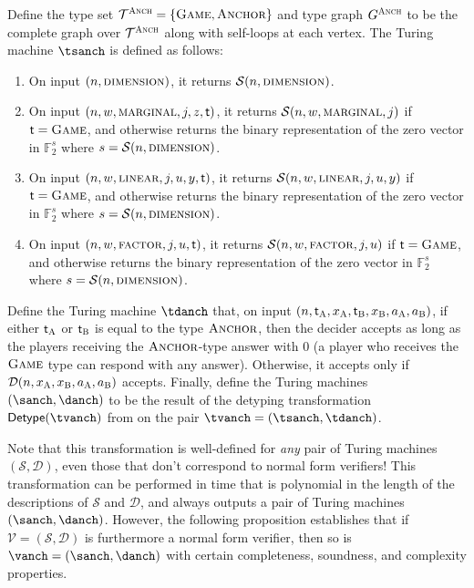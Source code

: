 \documentclass[11pt]{article}
\theoremstyle{definition}
\newcommand{\F}{\ensuremath{\mathbb{F}}}
\newcommand{\sampler}{\mathcal{S}}
\newcommand{\decider}{\mathcal{D}}
\newcommand{\verifier}{\mathcal{V}}
\newcommand{\type}{\mathcal{T}}
\newcommand{\gamestyle}[1]{\ensuremath{\textsc{#1}}\xspace}
\newcommand{\labelstyle}[1]{\ensuremath{\textsc{#1}}\xspace}
\newcommand{\tvarstyle}[1]{\mathsf{#1}}
\newcommand{\tvar}{\ensuremath{\tvarstyle{t}}}
\newcommand{\alice}{\labelstyle{A}}
\newcommand{\bob}{\labelstyle{B}}
\newcommand{\typestyle}[1]{\ensuremath{\textsc{#1}}\xspace}
\newcommand{\Anchor}{\typestyle{Anchor}}
\renewcommand{\Game}{\typestyle{Game}}
\newcommand{\anch}{\gamestyle{Anch}}
\newcommand{\tmstyle}[1]{\ensuremath{\mathsf{#1}}}
\newcommand{\detype}{\tmstyle{Detype}}
\begin{document}
Define the type set $\type^\anch = \{\Game, \Anchor\}$ and type graph
$G^\anch$ to be the complete graph over $\type^\anch$ along with self-loops at
each vertex. The Turing machine $\tsanch$ is defined as follows:
\begin{enumerate}
	\item On input $(n,\gamestyle{dimension})$, it returns $\sampler(n,\gamestyle{dimension})$.
	\item On input $(n,w,\gamestyle{marginal},j,z,\tvar)$, it returns $\sampler(n,w,\gamestyle{marginal},j)$ if $\tvar = \Game$, and otherwise returns the binary representation of the zero vector in $\F_2^s$ where $s = \sampler(n,\gamestyle{dimension})$.
	\item On input $(n,w,\gamestyle{linear},j,u,y,\tvar)$, it returns $\sampler(n,w,\gamestyle{linear},j,u,y)$ if $\tvar = \Game$, and otherwise returns the binary representation of the zero vector in $\F_2^s$ where $s = \sampler(n,\gamestyle{dimension})$.
	\item On input $(n,w,\gamestyle{factor},j,u,\tvar)$, it returns $\sampler(n,w,\gamestyle{factor},j,u)$ if $\tvar = \Game$, and otherwise returns the binary representation of the zero vector in $\F_2^s$ where $s = \sampler(n,\gamestyle{dimension})$.
\end{enumerate}
Define the Turing machine $\tdanch$ that, on input
$(n,\tvar_\alice,x_\alice,\tvar_\bob,x_\bob,a_\alice,a_\bob)$, if either
$\tvar_\alice$ or $\tvar_\bob$ is equal to the type $\Anchor$, then the decider
accepts as long as the players receiving the $\Anchor$-type answer with $0$ (a player who receives the $\Game$ type can respond with any answer). 
Otherwise, it accepts only if $\decider(n,x_\alice,x_\bob,a_\alice,a_\bob)$
accepts. Finally, define the Turing machines $(\sanch,\danch)$ to be the result of the detyping transformation $\detype(\tvanch)$ from  on the pair $\tvanch = (\tsanch,\tdanch)$. 

Note that this transformation is well-defined for \emph{any} pair of Turing machines $(\sampler,\decider)$, even those that don't correspond to normal form verifiers! This transformation can be performed in time that is polynomial in the length of the descriptions of $\sampler$ and $\decider$, and always outputs a pair of Turing machines $(\sanch,\danch)$. However, the following proposition establishes that if $\verifier = (\sampler,\decider)$ is furthermore a normal form verifier, then so is $\vanch = (\sanch,\danch)$ with certain completeness, soundness, and complexity properties.
\end{document}
